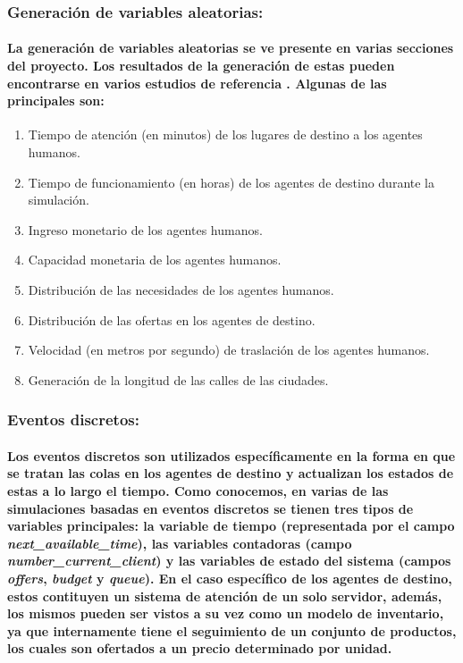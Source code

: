 \documentclass[12pt]{amsart}
\begin{document}
\subsubsection{Generación de variables aleatorias:}

\paragraph{La generación de variables aleatorias se ve presente en varias secciones del proyecto. Los resultados de la generación de estas pueden encontrarse en varios estudios de referencia \cite{vars1} \cite{vars2} \cite{vars3}. Algunas de las principales son:}

\begin {enumerate}
				\item Tiempo de atención (en minutos) de los lugares de destino a los agentes humanos.
				\item Tiempo de funcionamiento (en horas) de los agentes de destino durante la simulación.
				\item Ingreso monetario de los agentes humanos.
				\item Capacidad monetaria de los agentes humanos.
				\item Distribución de las necesidades de los agentes humanos.
				\item Distribución de las ofertas en los agentes de destino.
				\item Velocidad (en metros por segundo) de traslación de los agentes humanos.
				\item Generación de la longitud de las calles de las ciudades.
\end {enumerate}

\subsubsection{Eventos discretos:}

\paragraph{Los eventos discretos son utilizados específicamente en la forma en que se tratan las colas en los agentes de destino y actualizan los estados de estas a lo largo el tiempo. Como conocemos, en varias de las simulaciones basadas en eventos discretos se tienen tres tipos de variables principales: la variable de tiempo (representada por el campo \textit{next\_available\_time}), las variables contadoras (campo \textit{number\_current\_client}) y las variables de estado del sistema (campos \textit{offers}, \textit{budget} y \textit{queue}). En el caso específico de los agentes de destino, estos contituyen un sistema de atención de un solo servidor, además, los mismos pueden ser vistos a su vez como un modelo de inventario, ya que internamente tiene el seguimiento de un conjunto de productos, los cuales son ofertados a un precio determinado por unidad.}
\end{document}
